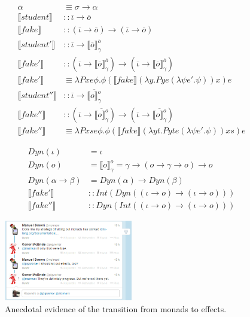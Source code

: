 \documentclass{article}
\newcommand{\statecps}[3]{\llbracket #3 \rrbracket^{#2}_{#1}}
\newcommand{\sem}[1]{\llbracket #1 \rrbracket}
\newcommand{\intens}[1]{\overline{#1}}
\begin{document}
\begin{align*}
\intens{\alpha} & \equiv \sigma \to \alpha \\
\sem{student} & :: \intens{\iota} \to \intens{o} \\
\sem{fake} & :: (\intens{\iota} \to \intens{o})
            \to (\intens{\iota} \to \intens{o}) \\
\sem{student'} & :: \intens{\iota} \to \statecps{\gamma}{\intens{o}}{\intens{o}} \\
\sem{fake'} & :: (\intens{\iota} \to \statecps{\gamma}{\intens{o}}{\intens{o}})
             \to (\intens{\iota} \to \statecps{\gamma}{\intens{o}}{\intens{o}}) \\
\sem{fake'} & \equiv \lambda P x e \phi.
  \phi (\sem{fake} (\lambda y. P y e (\lambda \psi e'. \psi)) x) e \\
\sem{student''} & :: \intens{\iota} \to \intens{\statecps{\gamma}{o}{o}} \\
\sem{fake''} & :: (\intens{\iota} \to \intens{\statecps{\gamma}{o}{o}})
              \to (\intens{\iota} \to \intens{\statecps{\gamma}{o}{o}}) \\
\sem{fake''} & \equiv \lambda P x s e \phi.
  \phi (\sem{fake} (\lambda y t. P y t e (\lambda \psi e'. \psi)) x s) e
\end{align*}

\begin{align*}
  Dyn(\iota) & = \iota \\
  Dyn(o) & = \statecps{\gamma}{o}{o} = \gamma \to (o \to \gamma \to o) \to o \\
  Dyn(\alpha \to \beta) & = Dyn(\alpha) \to Dyn(\beta) \\
  \sem{fake'} & :: Int(Dyn((\iota \to o) \to (\iota \to o))) \\
  \sem{fake''} & :: Dyn(Int((\iota \to o) \to (\iota \to o)))
\end{align*}

\begin{figure}
  \centering
  \includegraphics[width=0.5\textwidth]{monads-vs-effects-on-twitter}
  \caption{\label{fig:twitter} Anecdotal evidence of the transition from
    monads to effects.}
\end{figure}



\end{document}
